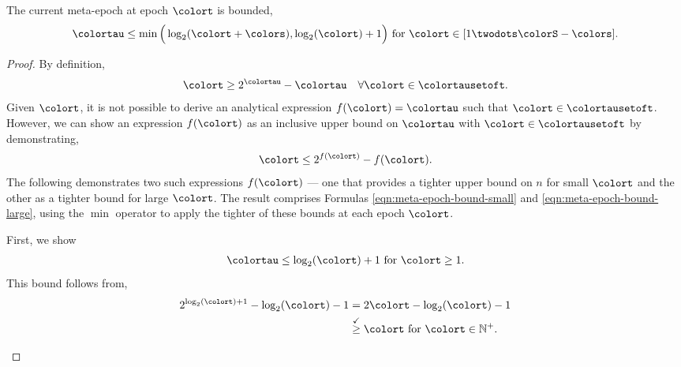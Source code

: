 \begin{lemma}
\label{thm:meta-epoch-bound}
The current meta-epoch at epoch $\colort$ is bounded,
\begin{align*}
\colortau \leq
\min\Big(
  \log_2(\colort + \colors),
  \log_2(\colort) + 1
\Big)
\text{ for } \colort \in [1 \twodots \colorS - \colors].
\end{align*}
\end{lemma}
\begin{proof}

By definition,
\begin{align*}
\colort \geq 2^{\colortau} - \colortau \quad \forall \colort \in \colortausetoft.
\end{align*}
Given $\colort$, it is not possible to derive an analytical expression $f(\colort) = \colortau$ such that $\colort \in \colortausetoft$.
However, we can show an expression $f(\colort)$ as an inclusive upper bound on $\colortau$ with $\colort \in \colortausetoft$ by demonstrating,
\begin{align*}
\colort \leq 2^{f(\colort)} - f(\colort).
\end{align*}
The following demonstrates two such expressions $f(\colort)$ --- one that provides a tighter upper bound on $n$ for small $\colort$ and the other as a tighter bound for large $\colort$.
The result comprises Formulas \ref{eqn:meta-epoch-bound-small} and \ref{eqn:meta-epoch-bound-large}, using the $\min$ operator to apply the tighter of these bounds at each epoch $\colort$.

\begin{proofpart}
First, we show
\begin{align}
\colortau \leq \log_2(\colort) + 1 \text{ for } \colort \geq 1.
\label{eqn:meta-epoch-bound-small}
\end{align}
This bound follows from,
\begin{align*}
2^{\log_{2}(\colort) + 1} - \log_2(\colort) - 1
&= 2\colort - \log_2(\colort) - 1 \\
&\stackrel{\checkmark}{\geq} \colort \text{ for } \colort \in \mathbb{N}^{+}.
\end{align*}
\end{proofpart}


\end{proof}
